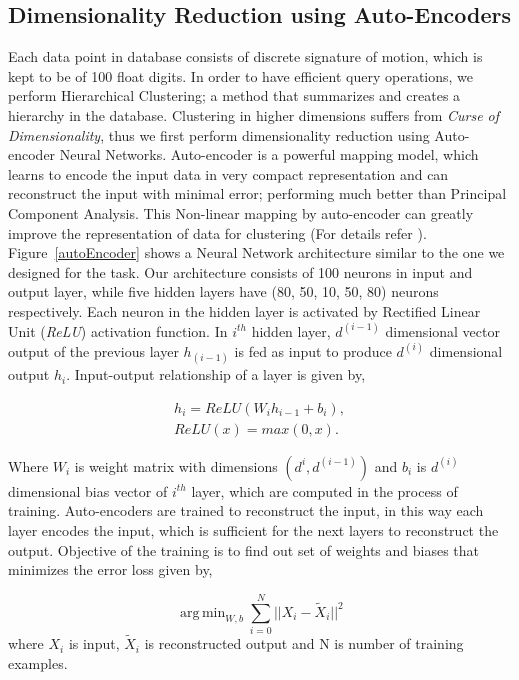 \documentclass[twocolumn,10pt]{asme2e}
\DeclareMathOperator*{\argminA}{arg\,min}
\begin{document}
\subsection{Dimensionality Reduction using Auto-Encoders}
Each data point in database consists of discrete signature of motion, which is kept to be of 100 float digits.
In order to have efficient query operations, we perform Hierarchical Clustering; a method that summarizes and creates a hierarchy in the database.
Clustering in higher dimensions suffers from \emph{Curse of Dimensionality}\cite{marimont1979}, thus we first perform dimensionality reduction using Auto-encoder Neural Networks.
Auto-encoder is a powerful mapping model, which learns to encode the input data in very compact representation and can reconstruct the input with minimal error; performing much better than Principal Component Analysis\cite{hinton2006}.
This Non-linear mapping by auto-encoder can greatly improve the representation of data for clustering (For details refer \cite{song2013}).
Figure~\ref{autoEncoder} shows a Neural Network architecture similar to the one we designed for the task.
Our architecture consists of 100 neurons in input and output layer, while five hidden layers have (80, 50, 10, 50, 80) neurons respectively.
Each neuron in the hidden layer is activated by Rectified Linear Unit (\emph{ReLU}) activation function.
In $i^{th}$ hidden layer, $d^{(i-1)}$ dimensional vector output of the previous layer $h_(i-1)$ is fed as input to produce $d^{(i)}$ dimensional output $h_i$.
Input-output relationship of a layer is given by,

\begin{eqnarray}\label{nnlayer}
  h_i = ReLU(W_{i}h_{i-1} + b_{i}), \\
  ReLU(x) = max(0, x).
\end{eqnarray}

Where $W_i$ is weight matrix with dimensions $(d^{i}, d^{(i-1)})$ and $b_i$ is $d^{(i)}$ dimensional bias vector of $i^{th}$ layer, which are computed in the process of training.
Auto-encoders are trained to reconstruct the input, in this way each layer encodes the input, which is sufficient for the next layers to reconstruct the output.
Objective of the training is to find out set of weights and biases that minimizes the error loss given by,

\begin{equation}\label{nnloss}
  \argminA_{W, b} \sum_{i=0}^{N} || X_i - \tilde{X}_i ||^2
\end{equation}
where $X_i$ is input, $\tilde{X}_i$ is reconstructed output and N is number of training examples.
\end{document}
